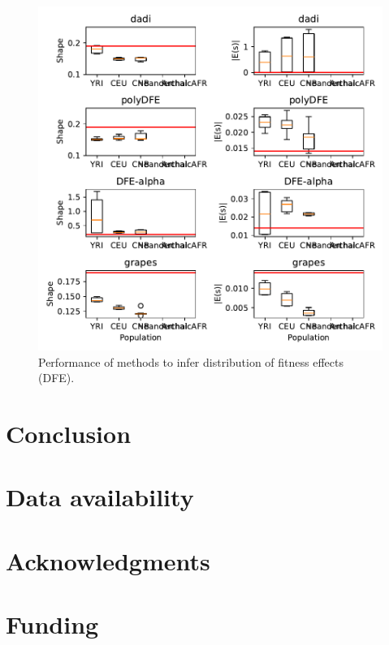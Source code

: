 \documentclass[hidelinks]{article}
\begin{document}
    \begin{figure}[ht]
        \centering
        \includegraphics[width=\textwidth]{figures/HomSap/OOA/dfe.inference.benchmark}
        \caption{
        \label{fig:dfe_humans}
        Performance of methods to infer distribution of fitness effects (DFE).
        }
    \end{figure}




\section*{Conclusion}
    \label{conclusion}

\section*{Data availability}\label{data_availability}


\section*{Acknowledgments}\label{acknowledgements}

\section*{Funding}
    \label{funding}


\end{document}
